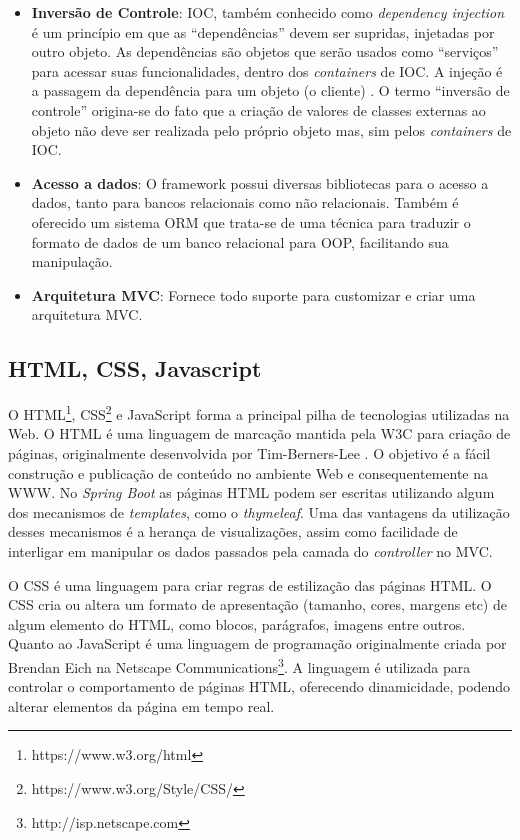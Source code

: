 \begin{itemize}
	\item{\textbf{Inversão de Controle}: \ac{IOC}, também conhecido como \textit{dependency injection} é um princípio em que as “dependências” devem ser supridas, injetadas por outro objeto. As dependências são objetos que serão usados como “serviços” para acessar suas funcionalidades, dentro dos \textit{containers} de \ac{IOC}. A injeção é a passagem da dependência para um objeto (o cliente) \citep{DependencyInjection2006}. O termo “inversão de controle” origina-se do fato que a criação de valores de classes externas ao objeto não deve ser realizada pelo próprio objeto mas, sim pelos \textit{containers} de \ac{IOC}.}
	
	\item{\textbf{Acesso a dados}: O framework possui diversas bibliotecas para o acesso a dados, tanto para bancos relacionais como não relacionais. Também é oferecido um sistema \ac{ORM} que trata-se de uma técnica para traduzir o formato de dados de um banco relacional para \ac{OOP}, facilitando sua manipulação.}
	
	\item{\textbf{Arquitetura MVC}: Fornece todo suporte para customizar e criar uma arquitetura \ac{MVC}.}
\end{itemize}

\subsection{HTML, CSS, Javascript}

O HTML\footnote{https://www.w3.org/html}, \ac{CSS}\footnote{https://www.w3.org/Style/CSS/} e JavaScript forma a principal pilha de tecnologias utilizadas na Web. O HTML é uma linguagem de marcação mantida pela \ac{W3C} para criação de páginas, originalmente desenvolvida por Tim-Berners-Lee \citep{Raggett1998}. O objetivo é a fácil construção e publicação de conteúdo no ambiente Web e consequentemente na \ac{WWW}. No \textit{Spring Boot} as páginas HTML podem ser escritas utilizando algum dos mecanismos de \textit{templates}, como o \textit{thymeleaf}. Uma das vantagens da utilização desses mecanismos é a herança de visualizações, assim como facilidade de interligar em manipular os dados passados pela camada do \textit{controller} no \ac{MVC}.

O \ac{CSS} é uma linguagem para criar regras de estilização das páginas \ac{HTML}. O CSS cria ou altera um formato de apresentação (tamanho, cores, margens etc) de algum elemento do HTML, como blocos, parágrafos, imagens entre outros. Quanto ao JavaScript é uma linguagem de programação originalmente criada por Brendan Eich na Netscape Communications\footnote{ http://isp.netscape.com}. A linguagem é utilizada para controlar o comportamento de páginas HTML, oferecendo dinamicidade, podendo alterar elementos da página em tempo real.

